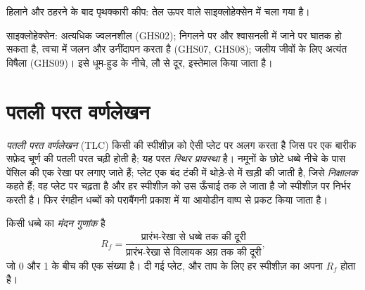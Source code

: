 \begin{omfigure}

{\small हिलाने और ठहरने के बाद पृथक्कारी कीप: तेल ऊपर वाले साइक्लोहेक्सेन
में चला गया है।}
\end{omfigure}

\begin{safety}{}
साइक्लोहेक्सेन: अत्यधिक ज्वलनशील (GHS02); निगलने पर और श्वासनली में जाने पर
घातक हो सकता है, त्वचा में जलन और उनींदापन करता है (GHS07, GHS08);
जलीय जीवों के लिए अत्यंत विषैला (GHS09)। इसे धूम-हुड के नीचे, लौ से दूर,
इस्तेमाल किया जाता है।
\end{safety}

\section{पतली परत वर्णलेखन}

\begin{definition}\label{def:g10:chemical-species:tlc}
\emph{पतली परत वर्णलेखन} (TLC)
किसी  की स्पीशीज़ को ऐसी प्लेट पर अलग करता है जिस पर एक बारीक सफ़ेद चूर्ण
की पतली परत चढ़ी होती है; यह परत \emph{स्थिर प्रावस्था} है।
नमूनों के छोटे धब्बे नीचे के पास पेंसिल की एक रेखा पर लगाए जाते हैं; प्लेट एक बंद
टंकी में थोड़े-से  में खड़ी की जाती है, जिसे
\emph{निक्षालक} कहते हैं; वह प्लेट पर चढ़ता है और हर
स्पीशीज़ को उस ऊँचाई तक ले जाता है जो स्पीशीज़ पर निर्भर करती है। फिर रंगहीन
धब्बों को पराबैंगनी प्रकाश में या आयोडीन वाष्प से प्रकट किया जाता है।
\end{definition}

\begin{definition}[मंदन गुणांक]\label{def:g10:chemical-species:retention-factor}
किसी धब्बे का \emph{मंदन गुणांक} है
\[
  R_f = \frac{\text{प्रारंभ-रेखा से धब्बे तक की दूरी}}
             {\text{प्रारंभ-रेखा से विलायक अग्र तक की दूरी}},
\]
जो 0 और 1 के बीच की एक संख्या है। दी गई प्लेट,  और ताप के लिए
हर स्पीशीज़ का अपना $R_f$ होता है।
\end{definition}

